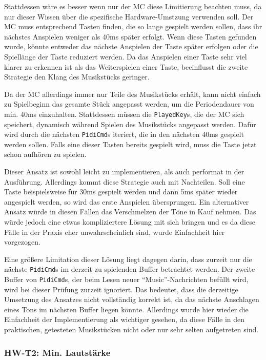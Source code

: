 Stattdessen wäre es besser wenn nur der \ac{MC} diese Limitierung beachten muss, da nur dieser Wissen über die spezifische Hardware-Umstzung verwenden soll.
Der \ac{MC} muss entsprechend Tasten finden, die so lange gespielt werden sollen, dass ihr nächstes Anspielen weniger als 40ms später erfolgt.
Wenn diese Tasten gefunden wurde, könnte entweder das nächste Anspielen der Taste später erfolgen oder die Spiellänge der Taste reduziert werden.
Da das Anspielen einer Taste sehr viel klarer zu erkennen ist als das Weiterspielen einer Taste, beeinflusst die zweite Strategie den Klang des Musikstücks geringer.

Da der \ac{MC} allerdings immer nur Teile des Musikstücks erhält, kann nicht einfach zu Spielbeginn das gesamte Stück angepasst werden, um die Periodendauer von min. 40ms einzuhalten.
Stattdessen müssen die \lstinline|PlayedKey|s, die der \ac{MC} sich speichert, dynamisch während Spielen des Musikstücks angepasst werden.
Dafür wird durch die nächsten \lstinline|PidiCmd|s iteriert, die in den nächsten 40ms gespielt werden sollen. Falls eine dieser Tasten bereits gespielt wird, muss die Taste jetzt schon aufhören zu spielen.

Dieser Ansatz ist sowohl leicht zu implementieren, als auch performat in der Ausführung.
Allerdings kommt diese Strategie auch mit Nachteilen.
Soll eine Taste beispielsweise für 30ms gespielt werden und dann 5ms später wieder angespielt werden, so wird das erste Anspielen übersprungen.
Ein alternativer Ansatz würde in diesen Fällen das Verschmelzen der Töne in Kauf nehmen.
Das würde jedoch eine etwas kompliziertere Lösung mit sich bringen und es da diese Fälle in der Praxis eher unwahrscheinlich sind, wurde Einfachheit hier vorgezogen.

Eine größere Limitation dieser Lösung liegt dagegen darin, dass zurzeit nur die nächste \lstinline|PidiCmd|s im derzeit zu spielenden Buffer betrachtet werden.
Der zweite Buffer von \lstinline|PidiCmd|s, der beim Lesen neuer \enquote{Music}-Nachrichten befüllt wird, wird bei dieser Prüfung zurzeit ignoriert.
Das bedeutet, dass die derzeitige Umsetzung des Ansatzes nicht vollständig korrekt ist, da das nächste Anschlagen eines Tons im nächsten Buffer liegen könnte.
Allerdings wurde hier wieder die Einfachheit der Implementierung als wichtiger gesehen, da diese Fälle in den praktischen, getesteten Musikstücken nicht oder nur sehr selten aufgetreten sind.


\subsubsection{HW-T2: Min. Lautstärke}

